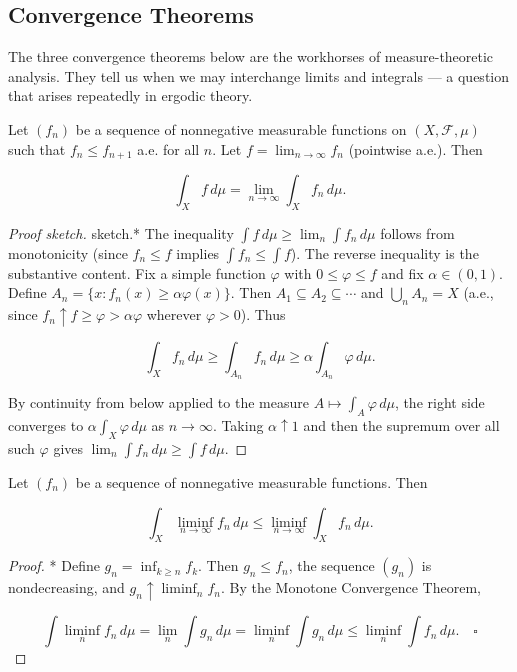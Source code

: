 \subsection{Convergence Theorems}\label{sec:7.4.4}

The three convergence theorems below are the workhorses of measure-theoretic analysis. They tell us when we may interchange limits and integrals --- a question that arises repeatedly in ergodic theory.

\begin{theorem}\label{thm:7.22}
Let $(f_n)$ be a sequence of nonnegative measurable functions on $(X, \mathcal{F}, \mu)$ such that $f_n \leq f_{n+1}$ a.e. for all $n$. Let $f = \lim_{n \to \infty} f_n$ (pointwise a.e.). Then

\[
\int_X f \, d\mu = \lim_{n \to \infty} \int_X f_n \, d\mu.
\]
\end{theorem}


\begin{proof}[Proof sketch]
sketch.* The inequality $\int f \, d\mu \geq \lim_n \int f_n \, d\mu$ follows from monotonicity (since $f_n \leq f$ implies $\int f_n \leq \int f$). The reverse inequality is the substantive content. Fix a simple function $\varphi$ with $0 \leq \varphi \leq f$ and fix $\alpha \in (0,1)$. Define $A_n = \{x : f_n(x) \geq \alpha \varphi(x)\}$. Then $A_1 \subseteq A_2 \subseteq \cdots$ and $\bigcup_n A_n = X$ (a.e., since $f_n \uparrow f \geq \varphi > \alpha \varphi$ wherever $\varphi > 0$). Thus

\[
\int_X f_n \, d\mu \geq \int_{A_n} f_n \, d\mu \geq \alpha \int_{A_n} \varphi \, d\mu.
\]

By continuity from below applied to the measure $A \mapsto \int_A \varphi \, d\mu$, the right side converges to $\alpha \int_X \varphi \, d\mu$ as $n \to \infty$. Taking $\alpha \uparrow 1$ and then the supremum over all such $\varphi$ gives $\lim_n \int f_n \, d\mu \geq \int f \, d\mu$.
\end{proof}


\begin{theorem}\label{thm:7.23}
Let $(f_n)$ be a sequence of nonnegative measurable functions. Then

\[
\int_X \liminf_{n \to \infty} f_n \, d\mu \leq \liminf_{n \to \infty} \int_X f_n \, d\mu.
\]
\end{theorem}


\begin{proof}
* Define $g_n = \inf_{k \geq n} f_k$. Then $g_n \leq f_n$, the sequence $(g_n)$ is nondecreasing, and $g_n \uparrow \liminf_n f_n$. By the Monotone Convergence Theorem,

\[
\int \liminf_n f_n \, d\mu = \lim_n \int g_n \, d\mu = \liminf_n \int g_n \, d\mu \leq \liminf_n \int f_n \, d\mu. \quad \square
\]

\end{proof}

